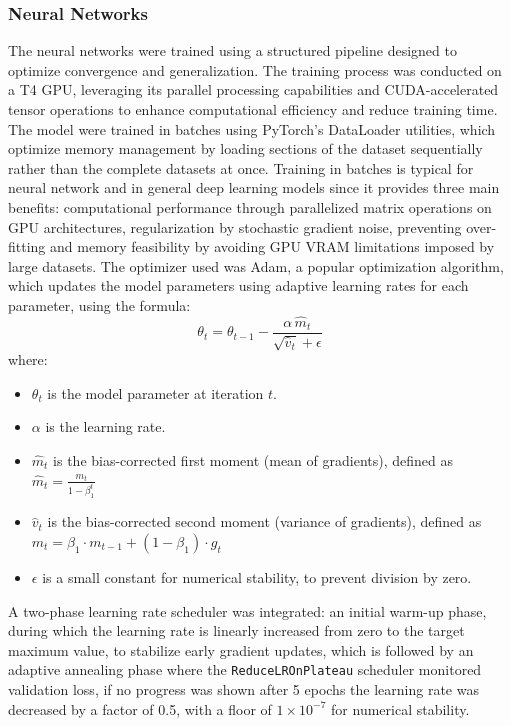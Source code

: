\subsubsection{Neural Networks}
The neural networks were trained using a structured pipeline designed to optimize convergence and generalization. The training process was conducted on a T4 GPU, leveraging its parallel processing capabilities and CUDA-accelerated tensor operations to enhance computational efficiency and reduce training time. The model were trained in batches using PyTorch's DataLoader utilities, which optimize memory management by loading sections of the dataset sequentially rather than the complete datasets at once. Training in batches is typical for neural network and in general deep learning models since it provides three main benefits: computational performance through parallelized matrix operations on GPU architectures, regularization by stochastic gradient noise, preventing over-fitting and memory feasibility by avoiding GPU VRAM limitations imposed by large datasets. The optimizer used was Adam, a  popular optimization algorithm,  which updates the model parameters using adaptive learning rates for each parameter, using the formula:
\[
\theta_t = \theta_{t-1} - \frac{\alpha\, \hat{m}_t}{\sqrt{\hat{v}_t} + \epsilon}
\]
where:
\begin{itemize}
    \item \(\theta_t\) is the model parameter at iteration \(t\).
    \item \(\alpha\) is the learning rate.
    \item \(\hat{m}_t\) is the bias-corrected first moment (mean of gradients), defined as $\hat{m}_t = \frac{m_t}{1 - \beta_1^t}$
    \item \(\hat{v}_t\) is the bias-corrected second moment (variance of gradients), defined as $m_t = \beta_1 \cdot m_{t-1} + (1 - \beta_1) \cdot g_t$
    \item \(\epsilon\) is a small constant for numerical stability, to prevent division by zero.
\end{itemize}
 A two-phase learning rate scheduler was integrated: an initial warm-up phase, during which the learning rate is linearly increased from zero to the target maximum value, to stabilize early gradient updates, which is followed by an adaptive annealing phase where the \texttt{ReduceLROnPlateau} scheduler monitored validation loss, if no progress was shown after 5 epochs the learning rate was decreased by a factor of 0.5, with a floor of $1 \times 10^{-7}$ for numerical stability. 
